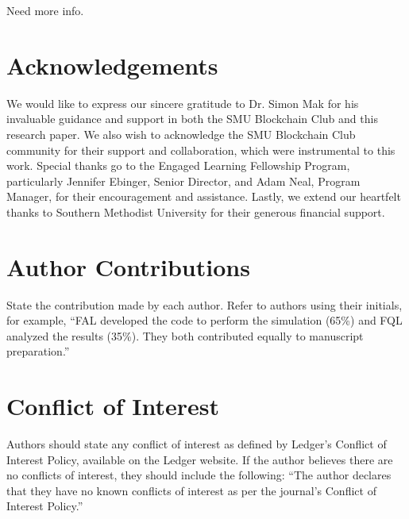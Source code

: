 \documentclass{ledger}
\begin{document}
Need more info.



\ledgernotes

\section*{Acknowledgements} 

We would like to express our sincere gratitude to Dr. Simon Mak for his invaluable guidance and support in both the SMU Blockchain Club and this research paper. We also wish to acknowledge the SMU Blockchain Club community for their support and collaboration, which were instrumental to this work. Special thanks go to the Engaged Learning Fellowship Program, particularly Jennifer Ebinger, Senior Director, and Adam Neal, Program Manager, for their encouragement and assistance. Lastly, we extend our heartfelt thanks to Southern Methodist University for their generous financial support.

\section*{Author Contributions}

State the contribution made by each author.  Refer to authors using their initials, for example, ``FAL developed the code to perform the simulation (65\%) and FQL analyzed the results (35\%).  They both contributed equally to manuscript preparation.''

\section*{Conflict of Interest}

Authors should state any conflict of interest as defined by Ledger's Conflict of Interest Policy, available on the Ledger website. If the author believes there are no conflicts of interest, they should include the following: ``The author declares that they have no known conflicts of interest as per the journal’s Conflict of Interest Policy.''





\end{document}

